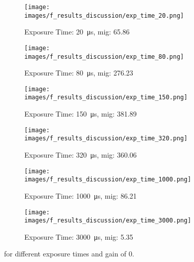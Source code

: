 \begin{figure}[h]
    \centering
    \begin{subfigure}[b]{0.4\textwidth}
        \centering
        \texttt{[image: images/f\_results\_discussion/exp\_time\_20.png]}
        \caption{Exposure Time: \SI{20}{\micro\second}, \gls{mig}: 65.86}
        \label{subfig:underexposed.png}
    \end{subfigure}
    \hspace{1cm}
    \begin{subfigure}[b]{0.4\textwidth}
        \centering
        \texttt{[image: images/f\_results\_discussion/exp\_time\_80.png]}
        \caption{Exposure Time: \SI{80}{\micro\second}, \gls{mig}: 276.23}
        \label{subfig:underexposed.png}
    \end{subfigure}

    \vspace{5mm}
    
    \begin{subfigure}[b]{0.4\textwidth}
        \centering
        \texttt{[image: images/f\_results\_discussion/exp\_time\_150.png]}
        \caption{Exposure Time: \SI{150}{\micro\second}, \gls{mig}: 381.89}
        \label{subfig:underexposed.png}
    \end{subfigure}
    \hspace{1cm}
    \begin{subfigure}[b]{0.4\textwidth}
        \centering
        \texttt{[image: images/f\_results\_discussion/exp\_time\_320.png]}
        \caption{Exposure Time: \SI{320}{\micro\second}, \gls{mig}: 360.06}
        \label{subfig:underexposed.png}
    \end{subfigure}

    \vspace{5mm}
    
    \begin{subfigure}[b]{0.4\textwidth}
        \centering
        \texttt{[image: images/f\_results\_discussion/exp\_time\_1000.png]}
        \caption{Exposure Time: \SI{1000}{\micro\second}, \gls{mig}: 86.21}
        \label{subfig:underexposed.png}
    \end{subfigure}
    \hspace{1cm}
    \begin{subfigure}[b]{0.4\textwidth}
        \centering
        \texttt{[image: images/f\_results\_discussion/exp\_time\_3000.png]}
        \caption{Exposure Time: \SI{3000}{\micro\second}, \gls{mig}: 5.35}
        \label{subfig:underexposed.png}
    \end{subfigure}
    \caption{ for different exposure times and gain of 0.}
\end{figure}

